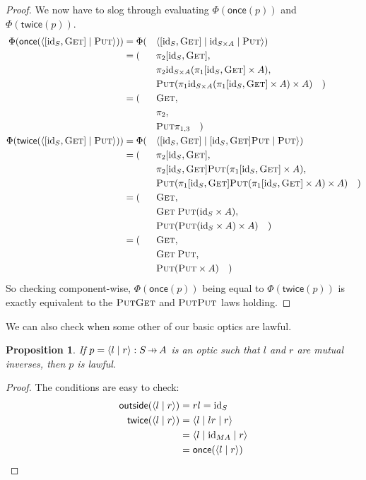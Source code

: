 \documentclass[11pt,letterpaper]{article}
\theoremstyle{plain}
\newtheorem{proposition}[theorem]{Proposition}
\theoremstyle{definition}
\newcommand{\id}{\mathrm{id}}
\newcommand{\rep}[2]{{\ensuremath \left\langle #1 \mid #2 \right\rangle}}
\newcommand{\repthree}[3]{{\ensuremath \langle #1 \mid #2 \mid #3 \rangle}}
\newcommand{\fget}{\textsc{Get}}
\newcommand{\fput}{\textsc{Put}}
\newcommand{\outside}{\mathsf{outside}}
\newcommand{\once}{\mathsf{once}}
\newcommand{\twice}{\mathsf{twice}}
\newcommand{\hto}{\ensuremath{\,\mathaccent\shortmid\rightarrow\,}}
\begin{document}
\begin{proof}
  We now have to slog through evaluating $\Phi(\once(p))$ and $\Phi(\twice(p))$.
  \begingroup
  \allowdisplaybreaks
  \begin{alignat*}{3}
    \Phi(\once(\rep{[\id_S, \fget]}{\fput})) &=
    \Phi(&&\repthree{[\id_S, \fget]}{\id_{S \times A}}{\fput}) \\
    &= (&&\pi_2 [\id_S, \fget], \\
    &&&\pi_2 \id_{S \times A} (\pi_1 [\id_S, \fget] \times A), \\
    &&& \fput (\pi_1 \id_{S \times A} (\pi_1 [\id_S, \fget] \times A) \times A) \quad) \\
    &= (&&\fget, \\
    &&& \pi_2, \\
    &&& \fput \pi_{1,3} \quad) \\
    \Phi(\twice(\rep{[\id_S, \fget]}{\fput})) &=
    \Phi(&&\repthree{[\id_S, \fget]}{[\id_S, \fget]\fput}{\fput}) \\
    &= (&&\pi_2 [\id_S, \fget], \\
    &&&\pi_2 [\id_S, \fget]\fput (\pi_1 [\id_S, \fget] \times A), \\
    &&& \fput (\pi_1 [\id_S, \fget]\fput (\pi_1 [\id_S, \fget] \times A) \times A) \quad) \\
    &= (&&\fget, \\
    &&& \fget \; \fput (\id_S \times A), \\
    &&& \fput (\fput (\id_S \times A) \times A) \quad) \\
    &= (&&\fget, \\
    &&& \fget \; \fput, \\
    &&& \fput (\fput \times A) \quad)
  \end{alignat*}
  \endgroup
  So checking component-wise, $\Phi(\once(p))$ being equal to $\Phi(\twice(p))$ is exactly equivalent to the $\fput\fget$ and $\fput\fput$ laws holding.
\end{proof}

We can also check when some other of our basic optics are lawful.

\begin{proposition}
If $p = \rep{l}{r} : S \hto A$ is an optic such that $l$ and $r$ are mutual inverses, then $p$ is lawful.
\end{proposition}
\begin{proof}
The conditions are easy to check:
\begin{align*}
\outside(\rep{l}{r}) &= r l = \id_S \\
\twice(\rep{l}{r})
&= \repthree{l}{lr}{r} \\
&= \repthree{l}{\id_{MA}}{r} \\
&= \once(\rep{l}{r})
\end{align*}
\end{proof}
\end{document}

